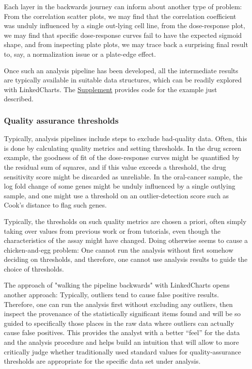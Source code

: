 \documentclass[twocolumn,10pt]{article}
\newcommand{\Supplement}{\href{https://anders-biostat.github.io/lc-paper/}{Supplement}}
\begin{document}
Each layer in the backwards journey can inform about another type of problem: From the correlation scatter plots, we may find that the correlation coefficient was unduly influenced by a single out-lying cell line, from the dose-response plot, we may find that specific dose-response curves fail to have the expected sigmoid shape, and from inspecting plate plots, we may trace back a surprising final result to, say, a normalization issue or a plate-edge effect.

Once such an analysis pipeline has been developed, all the intermediate results are typically available in suitable data structures, which can be readily explored with LinkedCharts. The \Supplement{} provides code for the example just described.

\subsubsection{Quality assurance thresholds}

Typically, analysis pipelines include steps to exclude bad-quality data. Often, this is done by calculating quality metrics and setting thresholds. In the drug screen example, the goodness of fit of the dose-response curves might be quantified by the residual sum of squares, and if this value exceeds a threshold, the drug sensitivity score might be discarded as unreliable. In the oral-cancer sample, the log fold change of some genes might be unduly influenced by a single outlying sample, and one might use a threshold on an outlier-detection score such as Cook's distance to flag such genes.

Typically, the thresholds on such quality metrics are chosen a priori, often simply taking over values from previous work or from tutorials, even though the characteristics of the assay might have changed. Doing otherwise seems to cause a chicken-and-egg problem: One cannot run the analysis without first somehow deciding on thresholds, and therefore, one cannot use analysis results to guide the choice of thresholds.

The approach of "walking the pipeline backwards" with LinkedCharts opens another approach: Typically, outliers tend to cause false positive results. Therefore, one can run the analysis first without excluding any outliers, then inspect the provenance of the statistically significant items found and will be so guided to specifically those places in the raw data where outliers can actually cause false positives. This provides the analyst with a better ``feel'' for the data and the analysis procedure and helps build an intuition that will allow to more critically judge whether traditionally used standard values for quality-assurance thresholds are appropriate for the specific data set under analysis. 
\end{document}
